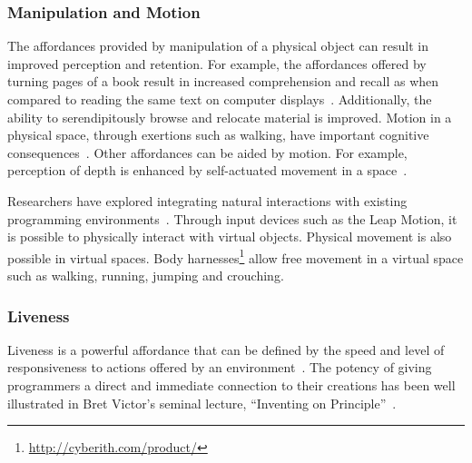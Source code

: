 \documentclass[conference]{IEEEtran}
\begin{document}

\subsubsection{Manipulation and Motion}

The affordances provided by manipulation of a physical object can result in improved perception and retention. 
For example, the affordances offered by turning pages of a book result in increased comprehension and recall as when compared to reading the same text on computer displays~\cite{Noyes:2008}.
Additionally, the ability to serendipitously browse and relocate material is improved.
Motion in a physical space, through exertions such as walking, have important cognitive consequences~\cite{Oppezzo:2014}.
Other affordances can be aided by motion. For example, perception of depth is enhanced by self-actuated movement in a space~\cite{Held:1963}.

Researchers have explored integrating natural interactions with existing programming environments~\cite{Delimarschi:2014}.
Through input devices such as the Leap Motion, it is possible to physically interact with virtual objects.
Physical movement is also possible in virtual spaces.  Body harnesses\footnote{\url{http://cyberith.com/product/}} allow free movement in a virtual space such as walking, running, jumping and crouching.%



\subsubsection{Liveness}

Liveness is a powerful affordance that can be defined by the speed and level of responsiveness to actions offered by an environment~\cite{Tanimoto:Liveness}.
The potency of giving programmers a direct and immediate connection to their creations has been well illustrated in Bret Victor's seminal lecture, ``Inventing on Principle''~\cite{Victor:InventingOnPrincipleVideo}.%
\end{document}
